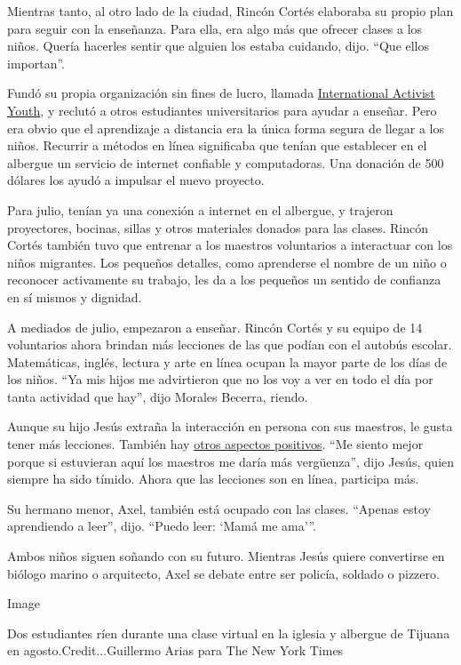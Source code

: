 Mientras tanto, al otro lado de la ciudad, Rincón Cortés elaboraba su
propio plan para seguir con la enseñanza. Para ella, era algo más que
ofrecer clases a los niños. Quería hacerles sentir que alguien los
estaba cuidando, dijo. ``Que ellos importan''.

Fundó su propia organización sin fines de lucro, llamada
\href{https://www.internationalactivistyouth.com/}{International
Activist Youth}, y reclutó a otros estudiantes universitarios para
ayudar a enseñar. Pero era obvio que el aprendizaje a distancia era la
única forma segura de llegar a los niños. Recurrir a métodos en línea
significaba que tenían que establecer en el albergue un servicio de
internet confiable y computadoras. Una donación de 500 dólares los ayudó
a impulsar el nuevo proyecto.

Para julio, tenían ya una conexión a internet en el albergue, y trajeron
proyectores, bocinas, sillas y otros materiales donados para las clases.
Rincón Cortés también tuvo que entrenar a los maestros voluntarios a
interactuar con los niños migrantes. Los pequeños detalles, como
aprenderse el nombre de un niño o reconocer activamente su trabajo, les
da a los pequeños un sentido de confianza en sí mismos y dignidad.

A mediados de julio, empezaron a enseñar. Rincón Cortés y su equipo de
14 voluntarios ahora brindan más lecciones de las que podían con el
autobús escolar. Matemáticas, inglés, lectura y arte en línea ocupan la
mayor parte de los días de los niños. ``Ya mis hijos me advirtieron que
no los voy a ver en todo el día por tanta actividad que hay'', dijo
Morales Becerra, riendo.

Aunque su hijo Jesús extraña la interacción en persona con sus maestros,
le gusta tener más lecciones. También hay
\href{https://www.nytimes3xbfgragh.onion/2020/05/20/nyregion/coronavirus-students-schools.html}{otros
aspectos positivos}. ``Me siento mejor porque si estuvieran aquí los
maestros me daría más vergüenza'', dijo Jesús, quien siempre ha sido
tímido. Ahora que las lecciones son en línea, participa más.

Su hermano menor, Axel, también está ocupado con las clases. ``Apenas
estoy aprendiendo a leer'', dijo. ``Puedo leer: `Mamá me ama'''.

Ambos niños siguen soñando con su futuro. Mientras Jesús quiere
convertirse en biólogo marino o arquitecto, Axel se debate entre ser
policía, soldado o pizzero.

Image

Dos estudiantes ríen durante una clase virtual en la iglesia y albergue
de Tijuana en agosto.Credit...Guillermo Arias para The New York Times

